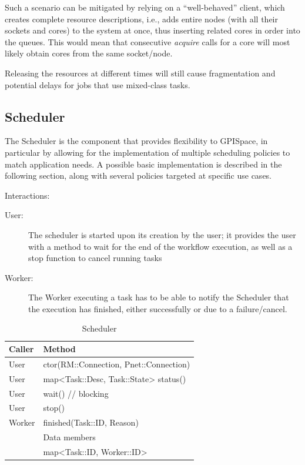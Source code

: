 \documentclass[10pt]{article}
\newcommand{\user}{User\xspace}
\newcommand{\sched}{Scheduler\xspace}
\newcommand{\worker}{Worker\xspace}
\newcommand{\rman}{RM\xspace}
\newcommand{\task}{Task\xspace}
\newcommand{\id}{::ID\xspace}
\newcommand{\conn}{::Connection\xspace}
\begin{document}
\begin{description}
     Such a scenario can be mitigated by relying on a ``well-behaved'' client, 
     which creates complete resource descriptions, i.e., adds entire nodes (with 
     all their sockets and cores) to the system at once, thus inserting related 
     cores in order into the queues. This would mean that consecutive 
     \emph{acquire} calls for a core will most likely obtain cores from the 
     same socket/node.
     
     Releasing the resources at different times will still cause fragmentation 
     and potential delays for jobs that use mixed-class tasks. 
     
\end{description}


\subsection{Scheduler}
The \sched is the component that provides flexibility to GPISpace, in particular
by allowing for the implementation of multiple scheduling policies to match
application needs.
A possible basic implementation is described in the following section, along
with several policies targeted at specific use cases. 

Interactions:
\begin{description}
    \item [\user:] The scheduler is started upon its creation by the user; it
    provides the user with a method to wait for the end of the workflow execution,
    as well as a stop function to cancel running tasks 
    \item [\worker:] The \worker executing a task has to be able to notify the
    \sched that the execution has finished, either successfully or due to a
    failure/cancel.
\end{description}
%
\begin{table}[ht]
    \centering
    \caption{Scheduler}
    \label{tab:sched}
    \bgroup
    \setlength{\tabcolsep}{2em}
    \begin{tabular}{ll}
        \toprule
        Caller & Method \\
        \midrule
        \user & ctor(\rman\conn, Pnet\conn) \\
        \user & map<\task::Desc, \task::State> status() \\
        \user & wait() // blocking  \\
        \user & stop() \\
        \worker & finished(\task\id, Reason) \\
        \midrule
        & Data members \\
        \midrule
        & map<\task\id, \worker\id> \\
        \bottomrule
    \end{tabular}
    \egroup
\end{table}
%
\end{document}
